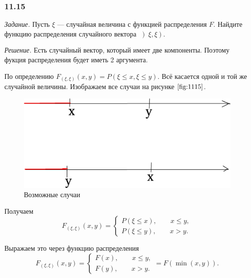 \subsubsection*{11.15}

\textit{Задание.} Пусть $ \xi $ --- случайная величина с функцией распределения $F$.
Найдите функцию распределения случайного вектора $ \left) \xi, \xi \right) $.

\textit{Решение.} Есть случайный вектор, который имеет две компоненты.
Поэтому фукция распределения будет иметь 2 аргумента.

По определению $F_{ \left( \xi, \xi \right) } \left( x, y \right) = P \left( \xi \leq x, \xi \leq y \right) $.
Всё касается одной и той же случайной величины.
Изображаем все случаи на рисунке $ \ref{fig:1115}$.

\begin{figure}[h!]
  \centering
  \includegraphics[width=.8\textwidth]{./pictures/11_15.png}
  \caption{Возможные случаи}
  \label{fig:1115}
\end{figure}

Получаем
$$F_{ \left( \xi, \xi \right) } \left( x, y \right) =
\begin{cases}
P \left( \xi \leq x \right), \qquad x \leq y, \\
P \left( \xi \leq y \right), \qquad x > y.
\end{cases}$$

Выражаем это через функцию распределения
$$F_{ \left( \xi, \xi \right) } \left( x, y \right) =
\begin{cases}
F \left( x \right), \qquad x \leq y, \\
F \left( y \right), \qquad x > y.
\end{cases} =
F \left( \min \left( x, y \right) \right).$$
